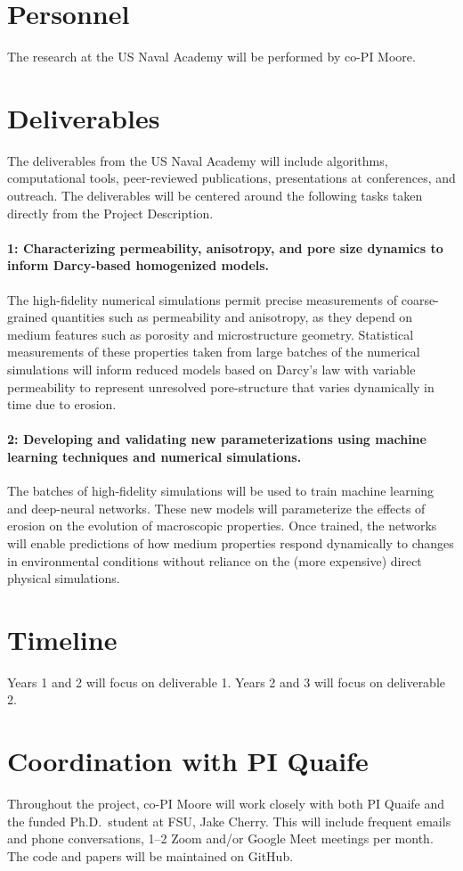 \documentclass[11pt]{article}
\begin{document}
\section*{Personnel}
The research at the US Naval Academy will be performed by co-PI Moore.

\section*{Deliverables}
The deliverables from the US Naval Academy will include algorithms,
computational tools, peer-reviewed publications, presentations at
conferences, and outreach. The deliverables will be centered around the
following tasks taken directly from the Project Description. 

\paragraph{1: Characterizing permeability, anisotropy, and pore size
dynamics to inform Darcy-based homogenized models.}
The high-fidelity numerical simulations permit precise measurements of coarse-grained quantities such as permeability and anisotropy, as they depend on medium features such as porosity and microstructure geometry. Statistical measurements of these properties taken from large batches of the numerical simulations will inform reduced models based on Darcy's law with variable permeability to represent unresolved pore-structure that varies dynamically in time due to erosion. 

\paragraph{2: Developing and validating new parameterizations using machine
learning techniques and numerical simulations.} The batches of high-fidelity simulations will be used to train machine learning and deep-neural networks. These new models will parameterize the effects of erosion on the evolution of macroscopic properties. Once trained, the networks will enable predictions of how medium properties respond dynamically to changes in environmental conditions without reliance on the (more expensive) direct physical simulations.


\section*{Timeline}
Years 1 and 2 will focus on deliverable 1. Years 2 and 3 will focus on
deliverable 2.

\section*{Coordination with PI Quaife}
Throughout the project, co-PI Moore will work closely with both PI Quaife and the funded Ph.D.~student at FSU, Jake Cherry. This will include frequent emails and phone conversations, 1--2 Zoom and/or Google Meet meetings per month. The code and papers will be maintained on GitHub.
\end{document}
